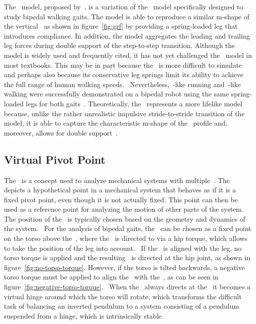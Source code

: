     The~ model, proposed by~\citeauthor{Geyer2006}, is a variation of the~ model specifically designed to study bipedal walking gaits. The model is able to reproduce a similar m-shape of the vertical~ as shown in figure~\ref{fig:grf} by providing a spring-loaded leg that introduces compliance. In addition, the model aggregates the leading and trailing leg forces during double support of the step-to-step transition. Although the~ model is widely used and frequently cited, it has not yet challenged the~ model in most textbooks. This may be in part because the~ is more difficult to simulate and perhaps also because its conservative leg springs limit its ability to achieve the full range of human walking speeds.~\cite{Lipfert2012} Nevertheless,~-like running and~-like walking were successfully demonstrated on a bipedal robot using the same spring-loaded legs for both gaits~\cite{Hubicki2018}. Theoretically, the~ represents a more lifelike model because, unlike the rather unrealistic impulsive stride-to-stride transition of the~ model, it is able to capture the characteristic m-shape of the~ profile and, moreover, allows for double support~\cite{Lee2018}.

    \subsection{Virtual Pivot Point}

    The~ is a concept used to analyze mechanical systems with multiple~. The~ depicts a hypothetical point in a mechanical system that behaves as if it is a fixed pivot point, even though it is not actually fixed. This point can then be used as a reference point for analyzing the motion of other parts of the system. The position of the~ is typically chosen based on the geometry and dynamics of the system.~\cite{Maus2010} For the analysis of bipedal gaits, the~ can be chosen as a fixed point on the torso above the~, where the~ is directed to via a hip torque, which allows to take the position of the leg into account.~\cite{Bommel2011} If the~ is aligned with the leg, no torso torque is applied and the resulting~ is directed at the hip joint, as shown in figure~\ref{fig:no-torso-torque}. However, if the torso is tilted backwards, a negative torso torque must be applied to align the~ with the~, as can be seen in figure~\ref{fig:negative-torso-torque}.~\cite{Maus2010} When the~ always directs at the~ it becomes a virtual hinge around which the torso will rotate, which transforms the difficult task of balancing an inverted pendulum to a system consisting of a pendulum suspended from a hinge, which is intrinsically stable.~\cite{Bommel2011}
    

